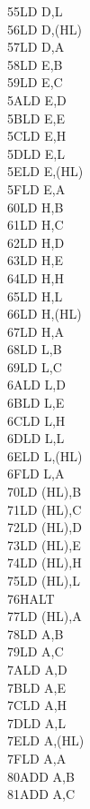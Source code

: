 \begin{multicols}{3}
{\begin{tabbing}
    55\>LD D,L\\
    56\>LD D,(HL)\\
    57\>LD D,A\\
    58\>LD E,B\\
    59\>LD E,C\\
    5A\>LD E,D\\
    5B\>LD E,E\\
    5C\>LD E,H\\
    5D\>LD E,L\\
    5E\>LD E,(HL)\\
    5F\>LD E,A\\
    60\>LD H,B\\
    61\>LD H,C\\
    62\>LD H,D\\
    63\>LD H,E\\
    64\>LD H,H\\
    65\>LD H,L\\
    66\>LD H,(HL)\\
    67\>LD H,A\\
    68\>LD L,B\\
    69\>LD L,C\\
    6A\>LD L,D\\
    6B\>LD L,E\\
    6C\>LD L,H\\
    6D\>LD L,L\\
    6E\>LD L,(HL)\\
    6F\>LD L,A\\
    70\>LD (HL),B\\
    71\>LD (HL),C\\
    72\>LD (HL),D\\
    73\>LD (HL),E\\
    74\>LD (HL),H\\
    75\>LD (HL),L\\
    76\>HALT\\
    77\>LD (HL),A\\
    78\>LD A,B\\
    79\>LD A,C\\
    7A\>LD A,D\\
    7B\>LD A,E\\
    7C\>LD A,H\\
    7D\>LD A,L\\
    7E\>LD A,(HL)\\
    7F\>LD A,A\\
    80\>ADD A,B\\
    81\>ADD A,C\\

\end{tabbing}}
\end{multicols}
